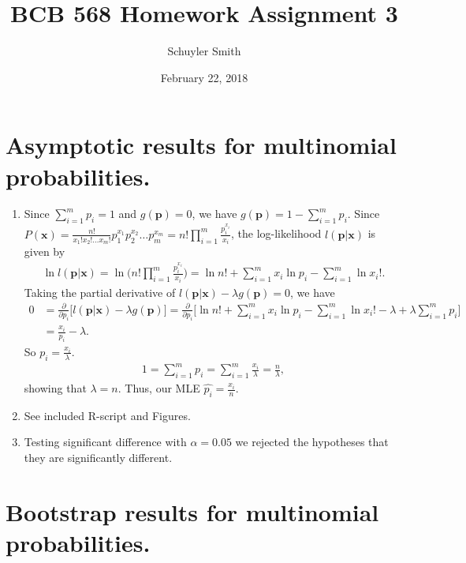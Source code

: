 \documentclass[12pt]{article}
\begin{document}
\setlength{\parindent}{0pt}
\title{BCB 568 Homework Assignment 3}
\author{Schuyler Smith}
\date{February 22, 2018}
 \maketitle
\section*{Asymptotic results for multinomial probabilities.}

    \begin{enumerate}[label = \textbf{\alph*.}]
        \item Since $\sum_{i = 1}^m p_i = 1$ and $g(\bm{p}) = 0$, we have $g(\bm{p}) = 1 - \sum_{i = 1}^m p_i$.  Since $P(\bm{x}) = \frac{n!}{x_1!x_2!\dots x_m!}p_1^{x_1}p_2^{x_2}\dots p_m^{x_m} = n!\prod_{i = 1}^m \frac{p_i^{x_i}}{x_i}$, the log-likelihood $l(\bm{p} | \bm{x})$ is given by
            \begin{align*}
                \ln l(\bm{p} | \bm{x}) = \ln \Bigg(n!\prod_{i = 1}^m \frac{p_i^{x_i}}{x_i} \Bigg) = \ln{n!} + \sum_{i = 1}^m x_i\ln{p_i} - \sum_{i = 1}^m \ln{x_i!}.
            \end{align*}
        Taking the partial derivative of $l(\bm{p} | \bm{x}) - \lambda g(\bm{p}) = 0$, we have
            \begin{align*}
                0 &= \frac{\partial}{\partial p_i}\Bigg[l(\bm{p} | \bm{x}) - \lambda g(\bm{p})\Bigg] = \frac{\partial}{\partial p_i}\Bigg[\ln{n!} + \sum_{i = 1}^m x_i\ln{p_i} - \sum_{i = 1}^m \ln{x_i!} - \lambda + \lambda\sum_{i = 1}^mp_i\Bigg]\\
                &=\frac{x_i}{p_i} - \lambda.
            \end{align*}
        So $p_i = \frac{x_i}{\lambda}$.
            \begin{align*}
                1 = \sum_{i = 1}^m p_i = \sum_{i = 1}^m \frac{x_i}{\lambda} = \frac{n}{\lambda},
            \end{align*}
        showing that $\lambda = n$.    Thus, our MLE $\hat{p_i} = \frac{x_i}{n}$.
        \item See included R-script and Figures.
        
        \item Testing significant difference with $\alpha = 0.05$ we rejected the hypotheses that they are significantly different.
    \end{enumerate}
\section*{Bootstrap results for multinomial probabilities.}
\end{document}
